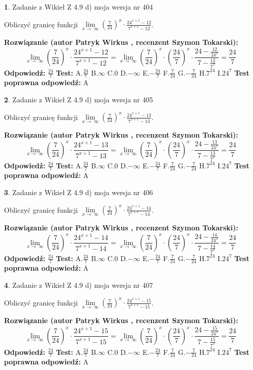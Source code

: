 \documentclass[12pt, a4paper]{article}
\theoremstyle{definition} %
\newtheorem{zad}{}
\newcommand{\zadStart}[1]{\begin{zad}#1\newline}
\newcommand{\zadStop}{\end{zad}}
\newcommand{\rozwStart}[2]{\noindent \textbf{Rozwiązanie (autor #1 , recenzent #2): }\newline}
\newcommand{\rozwStop}{\newline}
\newcommand{\odpStart}{\noindent \textbf{Odpowiedź:}\newline}
\newcommand{\odpStop}{\newline}
\newcommand{\testStart}{\noindent \textbf{Test:}\newline}
\newcommand{\testStop}{\newline}
\newcommand{\kluczStart}{\noindent \textbf{Test poprawna odpowiedź:}\newline}
\newcommand{\kluczStop}{\newline}
\begin{document}
\zadStart{Zadanie z Wikieł Z 4.9 d) moja wersja nr 404}


Obliczyć granicę funkcji  $\lim\limits_{x\to\ \infty}(\frac{7}{24})^{x}\cdot\frac{24^{x+1}-12}{7^{x+1}-12}$.
\zadStop
\rozwStart{Patryk Wirkus}{Szymon Tokarski}
$$\lim\limits_{x\to\ \infty}(\frac{7}{24})^{x}\cdot\frac{24^{x+1}-12}{7^{x+1}-12}=\lim\limits_{x\to\ \infty}(\frac{7}{24})^{x}\cdot(\frac{24}{7})^{x} \cdot \frac{24-\frac{12}{24^{x}}}{7-\frac{12}{7^{x}}} = \frac{24}{7}$$
\rozwStop
\odpStart
$\frac{24}{7}$
\odpStop
\testStart
A.$\frac{24}{7}$ B.$\infty$ C.$0$ D.$-\infty$ E.$-\frac{24}{7}$
F.$\frac{7}{24}$ G.$-\frac{7}{24}$
H.$7^{24}$
I.$24^{7}$
\testStop
\kluczStart
A
\kluczStop



\zadStart{Zadanie z Wikieł Z 4.9 d) moja wersja nr 405}


Obliczyć granicę funkcji  $\lim\limits_{x\to\ \infty}(\frac{7}{24})^{x}\cdot\frac{24^{x+1}-13}{7^{x+1}-13}$.
\zadStop
\rozwStart{Patryk Wirkus}{Szymon Tokarski}
$$\lim\limits_{x\to\ \infty}(\frac{7}{24})^{x}\cdot\frac{24^{x+1}-13}{7^{x+1}-13}=\lim\limits_{x\to\ \infty}(\frac{7}{24})^{x}\cdot(\frac{24}{7})^{x} \cdot \frac{24-\frac{13}{24^{x}}}{7-\frac{13}{7^{x}}} = \frac{24}{7}$$
\rozwStop
\odpStart
$\frac{24}{7}$
\odpStop
\testStart
A.$\frac{24}{7}$ B.$\infty$ C.$0$ D.$-\infty$ E.$-\frac{24}{7}$
F.$\frac{7}{24}$ G.$-\frac{7}{24}$
H.$7^{24}$
I.$24^{7}$
\testStop
\kluczStart
A
\kluczStop



\zadStart{Zadanie z Wikieł Z 4.9 d) moja wersja nr 406}


Obliczyć granicę funkcji  $\lim\limits_{x\to\ \infty}(\frac{7}{24})^{x}\cdot\frac{24^{x+1}-14}{7^{x+1}-14}$.
\zadStop
\rozwStart{Patryk Wirkus}{Szymon Tokarski}
$$\lim\limits_{x\to\ \infty}(\frac{7}{24})^{x}\cdot\frac{24^{x+1}-14}{7^{x+1}-14}=\lim\limits_{x\to\ \infty}(\frac{7}{24})^{x}\cdot(\frac{24}{7})^{x} \cdot \frac{24-\frac{14}{24^{x}}}{7-\frac{14}{7^{x}}} = \frac{24}{7}$$
\rozwStop
\odpStart
$\frac{24}{7}$
\odpStop
\testStart
A.$\frac{24}{7}$ B.$\infty$ C.$0$ D.$-\infty$ E.$-\frac{24}{7}$
F.$\frac{7}{24}$ G.$-\frac{7}{24}$
H.$7^{24}$
I.$24^{7}$
\testStop
\kluczStart
A
\kluczStop



\zadStart{Zadanie z Wikieł Z 4.9 d) moja wersja nr 407}


Obliczyć granicę funkcji  $\lim\limits_{x\to\ \infty}(\frac{7}{24})^{x}\cdot\frac{24^{x+1}-15}{7^{x+1}-15}$.
\zadStop
\rozwStart{Patryk Wirkus}{Szymon Tokarski}
$$\lim\limits_{x\to\ \infty}(\frac{7}{24})^{x}\cdot\frac{24^{x+1}-15}{7^{x+1}-15}=\lim\limits_{x\to\ \infty}(\frac{7}{24})^{x}\cdot(\frac{24}{7})^{x} \cdot \frac{24-\frac{15}{24^{x}}}{7-\frac{15}{7^{x}}} = \frac{24}{7}$$
\rozwStop
\odpStart
$\frac{24}{7}$
\odpStop
\testStart
A.$\frac{24}{7}$ B.$\infty$ C.$0$ D.$-\infty$ E.$-\frac{24}{7}$
F.$\frac{7}{24}$ G.$-\frac{7}{24}$
H.$7^{24}$
I.$24^{7}$
\testStop
\kluczStart
A
\kluczStop
\end{document}
